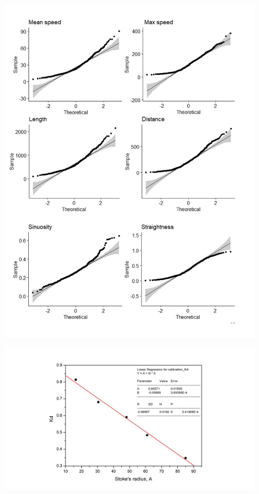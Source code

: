 \documentclass[alpha-refs]{wiley-article}
\begin{document}
\begin{figure}[hbt!]
  \includegraphics[width=1\linewidth]{qqplot.jpg}
  \caption{}
  \centering
\end{figure}

\begin{figure}[hbt!]
  \includegraphics[width=1\linewidth]{stoke.jpg}
  \caption{}
  \centering
\end{figure}
\end{document}
